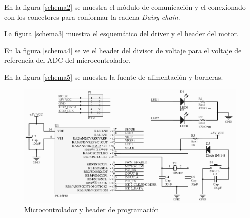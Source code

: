 \documentclass[a4paper,10pt]{article}
\begin{document}
En la figura \ref{schema2} se muestra el m\'odulo de comunicaci\'on y el conexionado con los conectores para conformar la cadena \emph{Daisy chain}.

La figura \ref{schema3} muestra el esquem\'atico del driver y el header del motor.

En la figura \ref{schema4} se ve el header del divisor de voltaje para el voltaje de referencia del ADC del microcontrolador.

En la figura \ref{schema5} se muestra la fuente de alimentaci\'on y borneras.

\begin{figure}
\centering
\includegraphics[scale=.3]{schemaMicro.png}
\caption{Microcontrolador y header de programaci\'on}
\label{schema1}
\end{figure}
\end{document}
